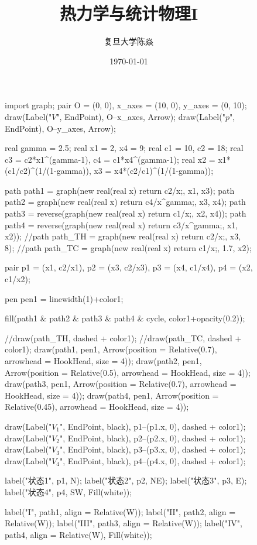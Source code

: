 \documentclass[UTF8, sub2section]{ctexbook}
\title{
	\vspace{-4 cm}
	\fontspec{Times New Roman}
	\CJKfamily{中宋}
	热力学与统计物理I
}
\author{
	\CJKfamily{楷体}
	复旦大学\phantom{空格}陈焱
}
\date{
	\CJKfamily{楷体}
	\today
}
\numberwithin{equation}{chapter} %
\begin{document}
	\begin{figure}
		\begin{asy}
		import graph;
		pair O = (0, 0), x_axes = (10, 0), y_axes = (0, 10);
		draw(Label("$V$", EndPoint), O--x_axes, Arrow);
		draw(Label("$p$", EndPoint), O--y_axes, Arrow);
		
		real gamma = 2.5;
		real x1 = 2, x4 = 9;
		real c1 = 10, c2 = 18;
		real c3 = c2*x1^(gamma-1), c4 = c1*x4^(gamma-1);
		real x2 = x1*(c1/c2)^(1/(1-gamma)), x3 = x4*(c2/c1)^(1/(1-gamma));
		
		path path1 = graph(new real(real x) {return c2/x;}, x1, x3);
		path path2 = graph(new real(real x) {return c4/x^gamma;}, x3, x4);
		path path3 = reverse(graph(new real(real x) {return c1/x;}, x2, x4));
		path path4 = reverse(graph(new real(real x) {return c3/x^gamma;}, x1, x2));
		//path path_TH = graph(new real(real x) {return c2/x;}, x3, 8);
		//path path_TC = graph(new real(real x) {return c1/x;}, 1.7, x2);
		
		pair p1 = (x1, c2/x1), p2 = (x3, c2/x3), p3 = (x4, c1/x4), p4 = (x2, c1/x2);
		
		pen pen1 = linewidth(1)+color1;
		
		fill(path1 & path2 & path3 & path4 & cycle, color1+opacity(0.2));
		
		//draw(path_TH, dashed + color1);
		//draw(path_TC, dashed + color1);
		draw(path1, pen1, Arrow(position = Relative(0.7), arrowhead = HookHead, size = 4));
		draw(path2, pen1, Arrow(position = Relative(0.5), arrowhead = HookHead, size = 4));
		draw(path3, pen1, Arrow(position = Relative(0.7), arrowhead = HookHead, size = 4));
		draw(path4, pen1, Arrow(position = Relative(0.45), arrowhead = HookHead, size = 4));
		
		draw(Label("$V_1$", EndPoint, black), p1--(p1.x, 0), dashed + color1);
		draw(Label("$V_2$", EndPoint, black), p2--(p2.x, 0), dashed + color1);
		draw(Label("$V_3$", EndPoint, black), p3--(p3.x, 0), dashed + color1);
		draw(Label("$V_4$", EndPoint, black), p4--(p4.x, 0), dashed + color1);
		
		label("状态1", p1, N);
		label("状态2", p2, NE);
		label("状态3", p3, E);
		label("状态4", p4, SW, Fill(white));
		
		label("I", path1, align = Relative(W));
		label("II", path2, align = Relative(W));
		label("III", path3, align = Relative(W));
		label("IV", path4, align = Relative(W), Fill(white));
		\end{asy}
	\end{figure}
\end{document}
